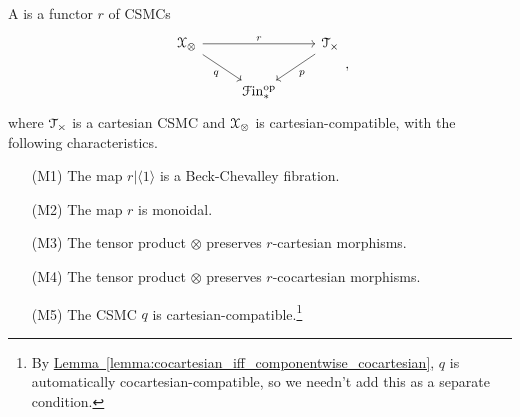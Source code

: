 \documentclass[main.tex]{subfiles}
\begin{document}
\begin{definition}
  \label{def:monoidal_beck_chevalley_fibration}
  A  is a functor $r$ of CSMCs
  \begin{equation*}
    \begin{tikzcd}
      \category{X}_{\otimes}
      \arrow[rr, "r"]
      \arrow[dr, swap, "q"]
      && \category{T}_{\times}
      \arrow[dl, "p"]
      \\
      & \Finp\op
    \end{tikzcd},
  \end{equation*}
  where $\mathcal{T}_{\times}$ is a cartesian CSMC and $\mathcal{X}_{\otimes}$ is cartesian-compatible, with the following characteristics.
  \begin{enumerate}
    \item[(M1)] The map $r|\langle 1 \rangle$ is a Beck-Chevalley fibration.

    \item[(M2)] The map $r$ is monoidal.

    \item[(M3)] The tensor product $\otimes$ preserves $r$-cartesian morphisms.

    \item[(M4)] The tensor product $\otimes$ preserves $r$-cocartesian morphisms.

    \item[(M5)] The CSMC $q$ is cartesian-compatible.\footnote{By \hyperref[lemma:cocartesian_iff_componentwise_cocartesian]{Lemma~\ref*{lemma:cocartesian_iff_componentwise_cocartesian}}, $q$ is automatically cocartesian-compatible, so we needn't add this as a separate condition.}







\end{enumerate}
\end{definition}
\end{document}
